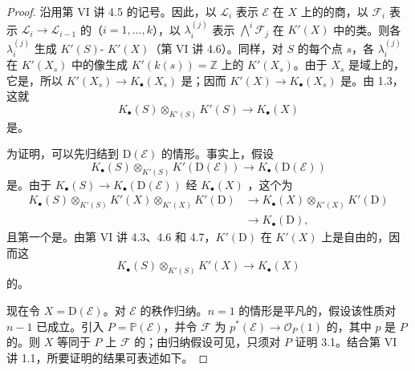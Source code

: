 \begin{proof}
沿用第 VI 讲 4.5 的记号。因此，以 $\mathcal L_i$ 表示 $\mathcal E$ 在 $X$ 上的的商，以 $\mathcal F_i$ 表示 $\mathcal L_i\to\mathcal L_{i-1}$ 的（$i=1,\ldots,k$），以 $\lambda_i^{(j)}$ 表示 $\bigwedge^i\mathcal F_j$ 在 $K'(X)$ 中的类。则各 $\lambda_i^{(j)}$ 生成 $K'(S)$- $K'(X)$（第 VI 讲 4.6）。同样，对 $S$ 的每个点 $s$，各 $\lambda_i^{(j)}$ 在 $K'(X_s)$ 中的像生成 $K'(k(s))=\mathbb Z$ 上的 $K'(X_s)$。由于 $X_s$ 是域上的，它是，所以 $K'(X_s)\to K_\bullet(X_s)$ 是；因而 $K'(X)\to K_\bullet(X_s)$ 是。由 1.3，这就
\[
K_\bullet(S)\otimes_{K'(S)}K'(S)\longrightarrow K_\bullet(X)
\]
是。

为证明，可以先归结到 $\mathrm D(\mathcal E)$ 的情形。事实上，假设
\[
K_\bullet(S)\otimes_{K'(S)}K'(\mathrm D(\mathcal E))\longrightarrow K_\bullet(\mathrm D(\mathcal E))
\]
是。由于 $K_\bullet(S)\to K_\bullet(\mathrm D(\mathcal E))$ 经 $K_\bullet(X)$ ，这个为
\[
\begin{aligned}
K_\bullet(S)\otimes_{K'(S)}K'(X)\otimes_{K'(X)}K'(\mathrm D)
&\longrightarrow K_\bullet(X)\otimes_{K'(X)}K'(\mathrm D)\\
&\longrightarrow K_\bullet(\mathrm D),
\end{aligned}
\]
且第一个是。由第 VI 讲 4.3、4.6 和 4.7，$K'(\mathrm D)$ 在 $K'(X)$ 上是自由的，因而这
\[
K_\bullet(S)\otimes_{K'(S)}K'(X)\longrightarrow K_\bullet(X)
\]
的。

现在令 $X=\mathrm D(\mathcal E)$。对 $\mathcal E$ 的秩作归纳。$n=1$ 的情形是平凡的，假设该性质对 $n-1$ 已成立。引入 $P=\mathbb P(\mathcal E)$，并令 $\mathcal F$ 为 $p^*(\mathcal E)\to\mathcal O_P(1)$ 的，其中 $p$ 是 $P$ 的。则 $X$ 等同于 $P$ 上 $\mathcal F$ 的；由归纳假设可见，只须对 $P$ 证明 3.1。结合第 VI 讲 1.1，所要证明的结果可表述如下。
\end{proof}


